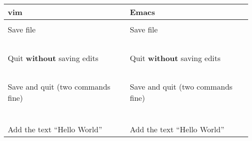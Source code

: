 \documentclass{article}
\begin{document}
\medskip
\medskip
\begin{tabularx}{\textwidth}{X|X}
  vim                               & Emacs                              \\
  \hline
                                    &                                    \\
  Save file                         & Save file                          \\
                                    &                                    \\
                                    &                                    \\
                                    &                                    \\
                                    &                                    \\
                                    &                                    \\
  Quit \textbf{without} saving edits& Quit \textbf{without} saving edits \\
                                    &                                    \\
                                    &                                    \\
                                    &                                    \\
                                    &                                    \\
                                    &                                    \\
  Save and quit (two commands fine) & Save and quit (two commands fine)  \\
                                    &                                    \\
                                    &                                    \\
                                    &                                    \\
                                    &                                    \\
                                    &                                    \\
                                    &                                    \\
  Add the text ``Hello World''      & Add the text ``Hello World''       \\

\end{tabularx}
\end{document}
